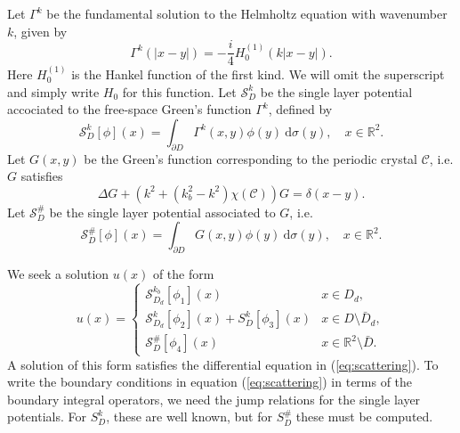 \documentclass[a4paper]{article}
\theoremstyle{definition}
\newcommand{\R}{\mathbb{R}}
\newcommand{\C}{\mathcal{C}}
\renewcommand{\S}{\mathcal{S}}
\newcommand{\dx}{\: \mathrm{d}}
\newcommand{\Scrystal}{\mathcal{S}_D^\#}
\newcommand{\eqnref}[1]{(\ref {#1})}
\begin{document}
Let $\Gamma^k$ be the fundamental solution to the Helmholtz equation with wavenumber $k$, given by
\begin{equation*}
\Gamma^k(|x-y|) = -\frac{i}{4}H_0^{(1)}(k|x-y|).
\end{equation*}
Here $H_0^{(1)}$ is the Hankel function of the first kind. We will omit the superscript and simply write $H_0$ for this function. Let $\S_{D}^k$ be the single layer potential accociated to the free-space Green's function $\Gamma^k$, defined by
\begin{equation*}
\S_D^k[\phi](x) = \int_{\partial D} \Gamma^k(x,y)\phi(y) \dx \sigma(y), \quad x \in \R^2.
\end{equation*}
Let $G(x,y)$ be the Green's function corresponding to the periodic crystal $\C$, i.e. $G$ satisfies
\begin{equation*} \label{eq:G}
\Delta G + (k^2+(k_b^2-k^2)\chi(\C))G = \delta(x-y).
\end{equation*}
Let $\Scrystal$ be the single layer potential associated to $G$, i.e.
\begin{equation*}
\Scrystal[\phi](x) = \int_{\partial D} G(x,y)\phi(y) \dx \sigma(y) , \quad x \in \R^2.
\end{equation*}

We seek a solution $u(x)$ of the form
\begin{equation} \label{eq:sol}
u(x) = \begin{cases}
\S_{D_d}^{k_b}[\phi_1](x) \quad &x\in D_d, \\
\S_{D_d}^{k}[\phi_2](x) + S_D^k[\phi_3](x) & x\in D\setminus \bar{D}_d, \\
\Scrystal[\phi_4](x) & x \in \R^2\setminus \bar{D}.
\end{cases}
\end{equation}
A solution of this form satisfies the differential equation in \eqnref{eq:scattering}. To write the boundary conditions in equation \eqnref{eq:scattering} in terms of the boundary integral operators, we need the jump relations for the single layer potentials. For $S_D^k$, these are well known, but for $S_D^\#$ these must be computed.
\end{document}
